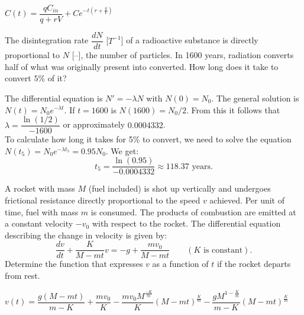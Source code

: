 \begin{Answer}
    \Question $C(t) = \dfrac{qC_{in}}{q + rV}+ C e^{-t(r+\frac{q}{V})}$
\end{Answer}

\begin{Exercise}
    \Question The disintegration rate $\dfrac{d N}{d t}$ [$T^{-1}$] of a radioactive substance is directly proportional to $N$ [--], the number of particles. In 1600 years, radiation converts half of what was originally present into
    converted. How long does it take to convert $5 \%$ of it?
\end{Exercise}

\begin{Answer}
    \Question The differential equation is $N' = -\lambda N$ with $N(0) = N_0$. The general solution is $N(t) = N_0e^{-\lambda t}$. If $t = 1600$ is $N(1600) = N_0/2$. From this it follows that $\lambda = \dfrac{\ln(1/2)}{-1600}$ or approximately $0.0004332$. \\
    To calculate how long it takes for 5\% to convert, we need to solve the equation\\
    $N(t_5) = N_0e^{-\lambda t_5} = 0.95N_0$. We get:
    \[t_5 = \dfrac{\ln(0.95)}{- 0.0004332} \approx 118.37 \mbox{ years}. \]
\end{Answer}

\begin{Exercise}
    \Question A rocket with mass $M$ (fuel included) is shot up vertically and undergoes frictional resistance directly proportional to the speed $v$ achieved. Per unit of time, fuel with mass $m$ is consumed. The products of combustion are emitted at a constant velocity $- v_0$ with respect to the rocket. The differential equation describing the change in velocity is given by:
    \[ \dfrac{d v}{d t} + \dfrac{K}{M - m t} v = - g + \dfrac{m v_0}{M - m t} \qquad (K \mbox{ is constant}).\]
    Determine the function that expresses $v$ as a function of $t$ if the rocket departs from rest.
\end{Exercise}

\begin{Answer}
    \Question $v(t) = \dfrac{g(M-mt)}{m-K} + \dfrac{m v_0}{K} - \dfrac{m v_0M^{\frac{-K}{m}}}{K}(M-mt)^{\frac{K}{m}}-\dfrac{gM^{1-\frac{K}{m}}}{m-K}(M-mt)^{\frac{K}{m}}$ %
\end{Answer}

